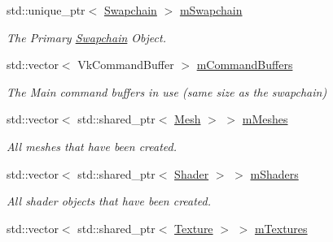 \begin{DoxyCompactItemize}
\mbox{\label{class_render_system_a2aee130a4efdaab6edcdc05b208c5e28}} 
std\+::unique\+\_\+ptr$<$ \mbox{\hyperlink{class_swapchain}{Swapchain}} $>$ \mbox{\hyperlink{class_render_system_a2aee130a4efdaab6edcdc05b208c5e28}{m\+Swapchain}}
\begin{DoxyCompactList}\small\item\em The Primary \mbox{\hyperlink{class_swapchain}{Swapchain}} Object. \end{DoxyCompactList}\item 
\mbox{\label{class_render_system_a661f131c9df9cd22b54a084bb4176c46}} 
std\+::vector$<$ Vk\+Command\+Buffer $>$ \mbox{\hyperlink{class_render_system_a661f131c9df9cd22b54a084bb4176c46}{m\+Command\+Buffers}}
\begin{DoxyCompactList}\small\item\em The Main command buffers in use (same size as the swapchain) \end{DoxyCompactList}\item 
\mbox{\label{class_render_system_aad7a90af8c55faeafdd36aecf0e1277a}} 
std\+::vector$<$ std\+::shared\+\_\+ptr$<$ \mbox{\hyperlink{class_mesh}{Mesh}} $>$ $>$ \mbox{\hyperlink{class_render_system_aad7a90af8c55faeafdd36aecf0e1277a}{m\+Meshes}}
\begin{DoxyCompactList}\small\item\em All meshes that have been created. \end{DoxyCompactList}\item 
\mbox{\label{class_render_system_af04b5ca30a770d24c64ac585044857e6}} 
std\+::vector$<$ std\+::shared\+\_\+ptr$<$ \mbox{\hyperlink{class_shader}{Shader}} $>$ $>$ \mbox{\hyperlink{class_render_system_af04b5ca30a770d24c64ac585044857e6}{m\+Shaders}}
\begin{DoxyCompactList}\small\item\em All shader objects that have been created. \end{DoxyCompactList}\item 
\mbox{\label{class_render_system_a1c01a933c74c9f3b19184f1015f20d27}} 
std\+::vector$<$ std\+::shared\+\_\+ptr$<$ \mbox{\hyperlink{class_texture}{Texture}} $>$ $>$ \mbox{\hyperlink{class_render_system_a1c01a933c74c9f3b19184f1015f20d27}{m\+Textures}}

\end{DoxyCompactItemize}
